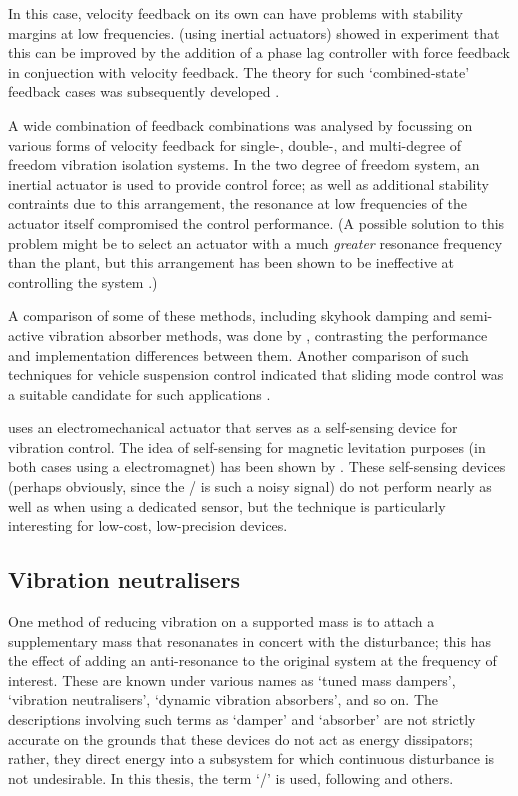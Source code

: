In this case, velocity feedback on its own can have problems with stability margins at low frequencies.
\textcite{benassi2002a} (using inertial actuators) showed in experiment that this can be improved by the addition of a phase lag controller with force feedback in conjuection with velocity feedback.
The theory for such `combined-state' feedback cases was subsequently developed \cite{benassi2002b}.

A wide combination of feedback combinations was analysed by \textcite{diaz2005} focussing on various forms of velocity feedback for single-, double-, and multi-degree of freedom vibration isolation systems.
In the two degree of freedom system, an inertial actuator is used to provide control force; as well as additional stability contraints due to this arrangement, the resonance at low frequencies of the actuator itself compromised the control performance.
(A possible solution to this problem might be to select an actuator with a much \emph{greater} resonance frequency than the plant, but this arrangement has been shown to be ineffective at controlling the system \cite[][Appendix~A]{benassi2002}.)

A comparison of some of these methods, including skyhook damping and semi-active vibration absorber methods, was done by \textcite{huyanan2007}, contrasting the performance and implementation differences between them.
Another comparison of such techniques for vehicle suspension control indicated that sliding mode control was a suitable candidate for such applications \cite{dong2009}.

\textcite{paulitsch2003} uses an electromechanical actuator that serves as a self-sensing device for vibration control.
The idea of self-sensing for magnetic levitation purposes (in both cases using a electromagnet) has been shown by \textcite{bleuler1992,vischer1993}.
These self-sensing devices (perhaps obviously, since the \backemf/ is such a noisy signal) do not perform nearly as well as when using a dedicated sensor, but the technique is particularly interesting for low-cost, low-precision devices.



\subsection{Vibration neutralisers}

One method of reducing vibration on a supported mass is to attach a supplementary mass that resonanates in concert with the disturbance; this has the effect of adding an anti-resonance to the original system at the frequency of interest.
These are known under various names as `tuned mass dampers', `vibration neutralisers', `dynamic vibration absorbers', and so on.
The descriptions involving such terms as `damper' and `absorber' are not strictly accurate on the grounds that these devices do not act as energy dissipators; rather, they direct energy into a subsystem for which continuous disturbance is not undesirable.
In this thesis, the term `\vibneut/' is used, following \textcite{kidner1998} and others.

